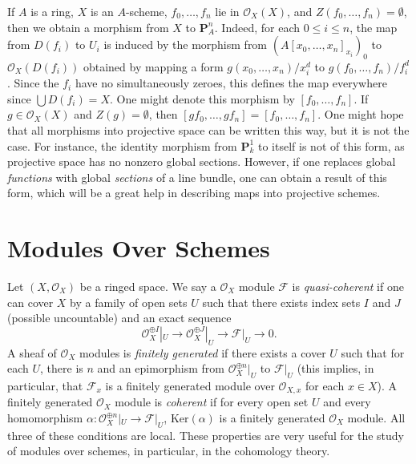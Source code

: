 If $A$ is a ring, $X$ is an $A$-scheme, $f_0,\dots,f_n$ lie in $\mathcal{O}_X(X)$, and $Z(f_0,\dots,f_n) = \emptyset$, then we obtain a morphism from $X$ to $\mathbf{P}^n_A$. Indeed, for each $0 \leq i \leq n$, the map from $D(f_i)$ to $U_i$ is induced by the morphism from $(A[x_0,\dots,x_n]_{x_i})_0$ to $\mathcal{O}_X(D(f_i))$ obtained by mapping a form $g(x_0,\dots,x_n)/x_i^d$ to $g(f_0,\dots,f_n)/f_i^d$. Since the $f_i$ have no simultaneously zeroes, this defines the map everywhere since $\bigcup D(f_i) = X$. One might denote this morphism by $[f_0,\dots,f_n]$. If $g \in \mathcal{O}_X(X)$ and $Z(g) = \emptyset$, then $[gf_0,\dots,gf_n] = [f_0,\dots,f_n]$. One might hope that all morphisms into projective space can be written this way, but it is not the case. For instance, the identity morphism from $\mathbf{P}^1_k$ to itself is not of this form, as projective space has no nonzero global sections. However, if one replaces global \emph{functions} with global \emph{sections} of a line bundle, one can obtain a result of this form, which will be a great help in describing maps into projective schemes.












\section{Modules Over Schemes}

Let $(X,\mathcal{O}_X)$ be a ringed space. We say a $\mathcal{O}_X$ module $\mathcal{F}$ is \emph{quasi-coherent} if one can cover $X$ by a family of open sets $U$ such that there exists index sets $I$ and $J$ (possible uncountable) and an exact sequence
%
\[ \mathcal{O}_X^{\oplus I}|_U \to \mathcal{O}_X^{\oplus J}|_U \to \mathcal{F}|_U \to 0. \]
%
A sheaf of $\mathcal{O}_X$ modules is \emph{finitely generated} if there exists a cover $U$ such that for each $U$, there is $n$ and an epimorphism from $\mathcal{O}_X^{\oplus n}|_U$ to $\mathcal{F}|_U$ (this implies, in particular, that $\mathcal{F}_x$ is a finitely generated module over $\mathcal{O}_{X,x}$ for each $x \in X$). A finitely generated $\mathcal{O}_X$ module is \emph{coherent} if for every open set $U$ and every homomorphism $\alpha: \mathcal{O}_X^{\oplus n}|_U \to \mathcal{F}|_U$, $\text{Ker}(\alpha)$ is a finitely generated $\mathcal{O}_X$ module. All three of these conditions are local. These properties are very useful for the study of modules over schemes, in particular, in the cohomology theory.

